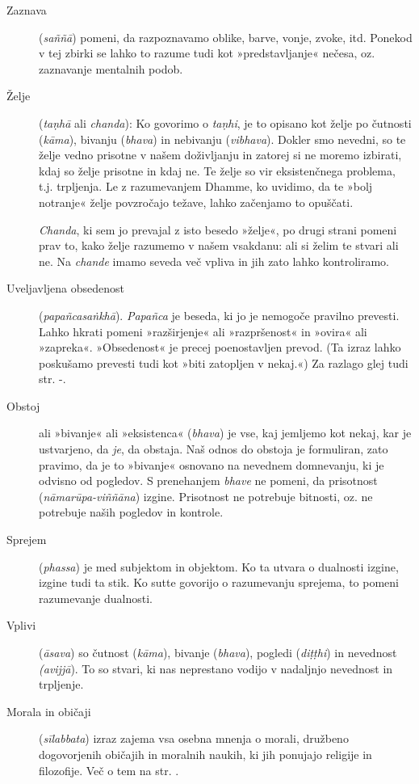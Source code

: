 \begin{description}
\item[Zaznava] (\emph{saññā}) pomeni, da razpoznavamo oblike, barve,
vonje, zvoke, itd. Ponekod v tej zbirki se lahko to razume tudi kot
»predstavljanje« nečesa, oz. zaznavanje mentalnih podob.

\item[Želje] (\emph{taṇhā} ali \emph{chanda}): Ko govorimo o
\emph{taṇhi}, je to opisano kot želje po čutnosti (\emph{kāma}), bivanju
(\emph{bhava}) in nebivanju (\emph{vibhava}). Dokler smo nevedni, so te
želje vedno prisotne v našem doživljanju in zatorej si ne moremo
izbirati, kdaj so želje prisotne in kdaj ne. Te želje so vir
eksistenčnega problema, t.j. trpljenja. Le z razumevanjem Dhamme, ko
uvidimo, da te »bolj notranje« želje povzročajo težave, lahko začenjamo
to opuščati.

\emph{Chanda}, ki sem jo prevajal z isto besedo »želje«, po drugi
strani pomeni prav to, kako želje razumemo v našem vsakdanu: ali si
želim te stvari ali ne. Na \emph{chande} imamo seveda več vpliva in jih
zato lahko kontroliramo.

\item[Uveljavljena obsedenost] (\emph{papañcasaṅkhā}).
\emph{Papañca} je beseda, ki jo je nemogoče pravilno prevesti. Lahko
hkrati pomeni »razširjenje« ali »razpršenost« in »ovira« ali »zapreka«.
»Obsedenost« je precej poenostavljen prevod. (Ta izraz lahko poskušamo
prevesti tudi kot »biti zatopljen v nekaj.«) Za razlago glej tudi str.
\pageref{vednostjo}-\pageref{vednostjo-end}.

\item[Obstoj] ali »bivanje« ali »eksistenca«
(\emph{bhava}) je vse, kaj jemljemo kot nekaj, kar je ustvarjeno, da
\emph{je}, da obstaja. Naš odnos do obstoja je formuliran, zato pravimo,
da je to »bivanje« osnovano na nevednem domnevanju, ki je odvisno od
pogledov. S prenehanjem \emph{bhave} ne pomeni, da prisotnost
(\emph{nāmarūpa-viññāna}) izgine. Prisotnost ne potrebuje bitnosti, oz.
ne potrebuje naših pogledov in kontrole.

\item[Sprejem] (\emph{phassa}) je med subjektom in objektom. Ko ta
utvara o dualnosti izgine, izgine tudi ta stik. Ko sutte govorijo o
razumevanju sprejema, to pomeni razumevanje dualnosti.

\item[Vplivi] (\emph{āsava}) so čutnost (\emph{kāma}), bivanje
(\emph{bhava}), pogledi (\emph{diṭṭhi}) in nevednost \emph{(avijjā}). To
so stvari, ki nas neprestano vodijo v nadaljnjo nevednost in trpljenje.

\item[Morala in običaji] (\emph{sīlabbata}) izraz zajema vsa osebna
mnenja o morali, družbeno dogovorjenih običajih in moralnih naukih, ki
jih ponujajo religije in filozofije. Več o tem na str.
\pageref{silabbata}.

\end{description}

